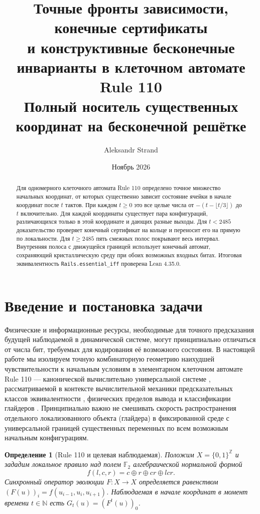 \documentclass[11pt, a4paper]{article}
\title{\vspace{-1cm}\textbf{\Large Точные фронты зависимости, конечные сертификаты\\и конструктивные бесконечные инварианты в клеточном автомате Rule 110}\\[0.45em]
{\large Полный носитель существенных координат на бесконечной решётке}}
\author{Aleksandr Strand}
\date{Ноябрь 2026}
\newtheorem{definition}[theorem]{Определение}
\begin{document}
\sloppy
\maketitle
\thispagestyle{plain}

\begin{abstract}
Для одномерного клеточного автомата Rule 110 определено точное множество начальных координат, от которых существенно зависит состояние ячейки в начале координат после $t$ тактов. При каждом $t\ge0$ это все целые числа от $-(t-\lfloor t/3\rfloor)$ до $t$ включительно. Для каждой координаты существует пара конфигураций, различающихся только в этой координате и дающих разные выходы. Для $t<2485$ доказательство проверяет конечный сертификат на кольце и переносит его на прямую по локальности. Для $t\ge2485$ пять смежных полос покрывают весь интервал. Внутренняя полоса с движущейся границей использует конечный автомат, сохраняющий кристаллическую среду при обоих возможных входных битах. Итоговая эквивалентность \texttt{Rails.essential\_iff} проверена Lean 4.35.0.
\end{abstract}

\tableofcontents
\vspace{1em}

\section{Введение и постановка задачи}

Физические и информационные ресурсы, необходимые для точного предсказания будущей наблюдаемой в динамической системе, могут принципиально отличаться от числа бит, требуемых для кодирования её возможного состояния. В настоящей работе мы изолируем точную комбинаторную геометрию наихудшей чувствительности к начальным условиям в элементарном клеточном автомате Rule 110 — канонической вычислительно универсальной системе \cite{cook2004}, рассматриваемой в контексте вычислительной механики предсказательных классов эквивалентности \cite{shalizi2001}, физических пределов вывода \cite{wolpert2008} и классификации глайдеров \cite{wolfram1986, martinez2006}. Принципиально важно не смешивать скорость распространения отдельного локализованного объекта (глайдера) в фиксированной среде с универсальной границей существенных переменных по всем возможным начальным конфигурациям.

\begin{definition}[Rule 110 и целевая наблюдаемая]
Положим $X = \{0, 1\}^{\mathbb{Z}}$ и зададим локальное правило над полем $\mathbb{F}_2$ алгебраической нормальной формой
\begin{equation}\label{eq:rule110}
f(l, c, r) = c \oplus r \oplus cr \oplus lcr.
\end{equation}
Синхронный оператор эволюции $F : X \to X$ определяется равенством $(F(u))_i = f(u_{i-1}, u_i, u_{i+1})$. Наблюдаемая в начале координат в момент времени $t \in \mathbb{N}$ есть $G_t(u) = (F^t(u))_0$.
\end{definition}
\end{document}
